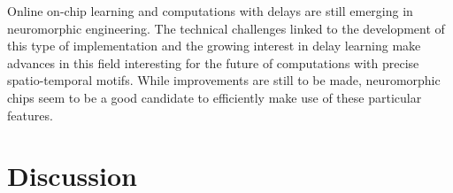 \documentclass[brainsci, %
               review,submit,pdftex,moreauthors
               ]{Definitions/mdpi}
\begin{document}
Online on-chip learning and computations with delays are still emerging in neuromorphic engineering. The technical challenges linked to the development of this type of implementation and the growing interest in delay learning make advances in this field interesting for the future of computations with precise spatio-temporal motifs. While improvements are still to be made, neuromorphic chips seem to be a good candidate to efficiently make use of these particular features. 
%
%
%
%
%
%
\section{Discussion}\label{sec:discussion}
\end{document}
